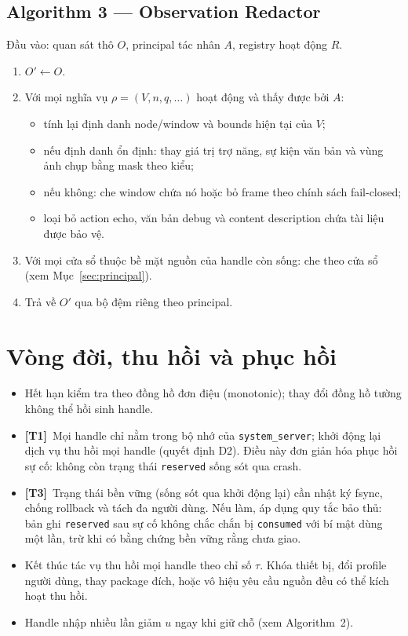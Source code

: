 \documentclass[11pt,a4paper]{article}
\newcommand{\code}[1]{\texttt{\small #1}}
\newcommand{\Tone}{\textbf{\color{shgreen}[T1]}}
\newcommand{\Tthree}{\textbf{\color{shgray}[T3]}}
\begin{document}
\subsection{Algorithm 3 --- Observation Redactor}

Đầu vào: quan sát thô $O$, principal tác nhân $A$, registry hoạt động $R$.

\begin{enumerate}
  \item $O' \leftarrow O$.
  \item Với mọi nghĩa vụ $\rho = (V, n, q, \ldots)$ hoạt động và thấy được bởi $A$:
    \begin{itemize}
      \item tính lại định danh node/window và bounds hiện tại của $V$;
      \item nếu định danh ổn định: thay giá trị trợ năng, sự kiện văn bản và vùng ảnh chụp bằng mask theo kiểu;
      \item nếu không: che window chứa nó hoặc bỏ frame theo chính sách fail-closed;
      \item loại bỏ action echo, văn bản debug và content description chứa tài liệu được bảo vệ.
    \end{itemize}
  \item Với mọi cửa sổ thuộc bề mặt nguồn của handle còn sống: che theo cửa sổ (xem Mục~\ref{sec:principal}).
  \item Trả về $O'$ qua bộ đệm riêng theo principal.
\end{enumerate}

\section{Vòng đời, thu hồi và phục hồi}

\begin{itemize}
  \item Hết hạn kiểm tra theo đồng hồ đơn điệu (monotonic); thay đổi đồng hồ tường không thể hồi sinh handle.
  \item \Tone\ Mọi handle chỉ nằm trong bộ nhớ của \code{system\_server}; khởi động lại dịch vụ thu hồi mọi handle (quyết định D2).
        Điều này đơn giản hóa phục hồi sự cố: không còn trạng thái \code{reserved} sống sót qua crash.
  \item \Tthree\ Trạng thái bền vững (sống sót qua khởi động lại) cần nhật ký fsync, chống rollback và tách đa người dùng. Nếu làm, áp dụng quy tắc bảo thủ:
        bản ghi \code{reserved} sau sự cố không chắc chắn bị \code{consumed} với bí mật dùng một lần, trừ khi có bằng chứng bền vững rằng chưa giao.
  \item Kết thúc tác vụ thu hồi mọi handle theo chỉ số $\tau$. Khóa thiết bị, đổi profile người dùng, thay
        package đích, hoặc vô hiệu yêu cầu nguồn đều có thể kích hoạt thu hồi.
  \item Handle nhập nhiều lần giảm $u$ ngay khi giữ chỗ (xem Algorithm~2).
\end{itemize}
\end{document}
